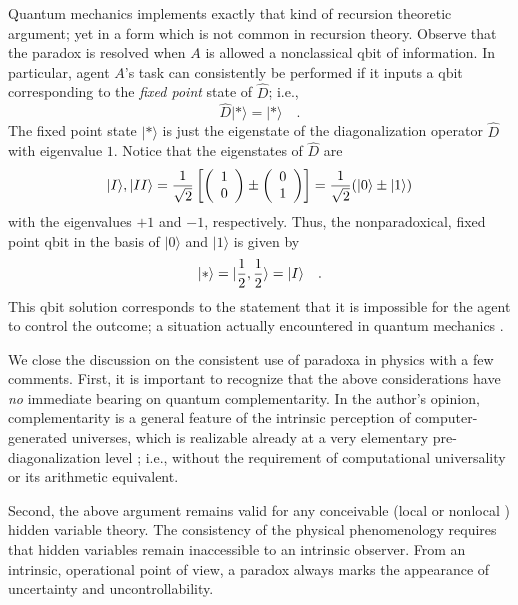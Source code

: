 Quantum mechanics implements exactly that kind of recursion theoretic
argument; yet in a form which is not common in recursion theory. Observe
that the paradox is resolved when
$A$ is allowed a nonclassical qbit of information.
In particular, agent $A$'s task can consistently be performed
if it inputs a qbit corresponding to the {\em fixed point} state
of
$\widehat{D}$; i.e.,
\begin{equation}
\widehat{D}\vert \ast \rangle =\vert \ast \rangle \quad .
\end{equation}
The fixed point state $\vert \ast \rangle $ is
just the eigenstate of the diagonalization operator
$\widehat{D}$ with
eigenvalue $1$.
Notice that the eigenstates of
$\widehat{D}$ are
\begin{equation}
\vert I\rangle      ,
\vert II\rangle
=
{1\over \sqrt{2}}\left[
\left( \begin{array}{c}1\\ 0\end{array} \right)\pm
\left( \begin{array}{c}0\\ 1\end{array} \right)
\right]
=
{1\over \sqrt{2}}(\vert 0\rangle \pm \vert 1\rangle )
\end{equation}
with the  eigenvalues $+1$ and $-1$, respectively.
Thus, the nonparadoxical, fixed point qbit
in the basis of $\vert 0\rangle $ and $\vert 1\rangle $ is given by
\begin{equation}
\vert \ast \rangle =\vert {1\over 2},{1\over 2} \rangle =\vert I\rangle \quad .
\end{equation}
This qbit solution corresponds to the statement that it is impossible
for the agent to control the outcome; a situation actually
encountered
in quantum mechanics \cite{fp}.


We close the discussion on the consistent use of paradoxa in physics
with a few comments. First, it is important to recognize that the above
considerations have {\em no} immediate bearing on quantum
complementarity.
In the author's opinion, complementarity is a general feature of the
intrinsic perception of computer-generated universes, which is
realizable already at a very elementary pre-diagonalization level
\cite{e-f-moore,finkelstein-83,svozil-93}; i.e., without
the requirement of computational universality or its arithmetic
equivalent.

Second,
the above argument remains valid
for any conceivable (local or nonlocal
\cite{pitowsky-82,pitowsky})
 hidden
variable theory.
The consistency of the physical
phenomenology requires that hidden variables remain inaccessible to an
intrinsic observer.
From an intrinsic, operational point of view, a paradox always
marks the appearance of uncertainty and uncontrollability.

